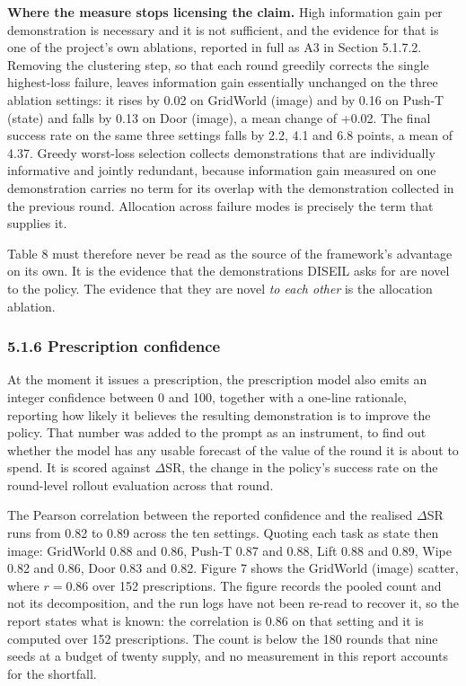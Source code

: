 \documentclass[
  11pt,
]{article}
\begin{document}
\textbf{Where the measure stops licensing the claim.} High information
gain per demonstration is necessary and it is not sufficient, and the
evidence for that is one of the project's own ablations, reported in
full as A3 in Section 5.1.7.2. Removing the clustering step, so that
each round greedily corrects the single highest-loss failure, leaves
information gain essentially unchanged on the three ablation settings:
it rises by 0.02 on GridWorld (image) and by 0.16 on Push-T (state) and
falls by 0.13 on Door (image), a mean change of +0.02. The final success
rate on the same three settings falls by 2.2, 4.1 and 6.8 points, a mean
of 4.37. Greedy worst-loss selection collects demonstrations that are
individually informative and jointly redundant, because information gain
measured on one demonstration carries no term for its overlap with the
demonstration collected in the previous round. Allocation across failure
modes is precisely the term that supplies it.

Table 8 must therefore never be read as the source of the framework's
advantage on its own. It is the evidence that the demonstrations DISEIL
asks for are novel to the policy. The evidence that they are novel
\emph{to each other} is the allocation ablation.

\hypertarget{prescription-confidence}{%
\subsubsection{5.1.6 Prescription
confidence}\label{prescription-confidence}}

At the moment it issues a prescription, the prescription model also
emits an integer confidence between 0 and 100, together with a one-line
rationale, reporting how likely it believes the resulting demonstration
is to improve the policy. That number was added to the prompt as an
instrument, to find out whether the model has any usable forecast of the
value of the round it is about to spend. It is scored against
\(\Delta\)SR, the change in the policy's success rate on the round-level
rollout evaluation across that round.

The Pearson correlation between the reported confidence and the realised
\(\Delta\)SR runs from 0.82 to 0.89 across the ten settings. Quoting
each task as state then image: GridWorld 0.88 and 0.86, Push-T 0.87 and
0.88, Lift 0.88 and 0.89, Wipe 0.82 and 0.86, Door 0.83 and 0.82. Figure
7 shows the GridWorld (image) scatter, where \(r = 0.86\) over 152
prescriptions. The figure records the pooled count and not its
decomposition, and the run logs have not been re-read to recover it, so
the report states what is known: the correlation is 0.86 on that setting
and it is computed over 152 prescriptions. The count is below the 180
rounds that nine seeds at a budget of twenty supply, and no measurement
in this report accounts for the shortfall.
\end{document}
